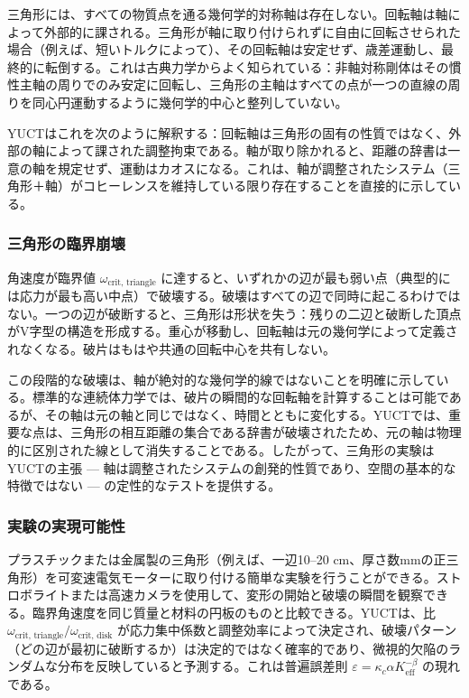 \documentclass[12pt,a4paper]{article}
\begin{document}
	三角形には、すべての物質点を通る幾何学的対称軸は存在しない。回転軸は軸によって外部的に課される。三角形が軸に取り付けられずに自由に回転させられた場合（例えば、短いトルクによって）、その回転軸は安定せず、歳差運動し、最終的に転倒する。これは古典力学からよく知られている：非軸対称剛体はその慣性主軸の周りでのみ安定に回転し、三角形の主軸はすべての点が一つの直線の周りを同心円運動するように幾何学的中心と整列していない。
	
	YUCTはこれを次のように解釈する：回転軸は三角形の固有の性質ではなく、外部の軸によって課された調整拘束である。軸が取り除かれると、距離の辞書は一意の軸を規定せず、運動はカオスになる。これは、軸が調整されたシステム（三角形＋軸）がコヒーレンスを維持している限り存在することを直接的に示している。
	
	\subsubsection{三角形の臨界崩壊}
	
	角速度が臨界値 \(\omega_{\text{crit, triangle}}\) に達すると、いずれかの辺が最も弱い点（典型的には応力が最も高い中点）で破壊する。破壊はすべての辺で同時に起こるわけではない。一つの辺が破断すると、三角形は形状を失う：残りの二辺と破断した頂点がV字型の構造を形成する。重心が移動し、回転軸は元の幾何学によって定義されなくなる。破片はもはや共通の回転中心を共有しない。
	
	この段階的な破壊は、軸が絶対的な幾何学的線ではないことを明確に示している。標準的な連続体力学では、破片の瞬間的な回転軸を計算することは可能であるが、その軸は元の軸と同じではなく、時間とともに変化する。YUCTでは、重要な点は、三角形の相互距離の集合である辞書が破壊されたため、元の軸は物理的に区別された線として消失することである。したがって、三角形の実験はYUCTの主張 — 軸は調整されたシステムの創発的性質であり、空間の基本的な特徴ではない — の定性的なテストを提供する。
	
	\subsubsection{実験の実現可能性}
	
	プラスチックまたは金属製の三角形（例えば、一辺10–20 cm、厚さ数mmの正三角形）を可変速電気モーターに取り付ける簡単な実験を行うことができる。ストロボライトまたは高速カメラを使用して、変形の開始と破壊の瞬間を観察できる。臨界角速度を同じ質量と材料の円板のものと比較できる。YUCTは、比 \(\omega_{\text{crit, triangle}} / \omega_{\text{crit, disk}}\) が応力集中係数と調整効率によって決定され、破壊パターン（どの辺が最初に破断するか）は決定的ではなく確率的であり、微視的欠陥のランダムな分布を反映していると予測する。これは普遍誤差則 \(\varepsilon = \kappa_c \alpha K_{\mathrm{eff}}^{-\beta}\) の現れである。
	
\end{document}

